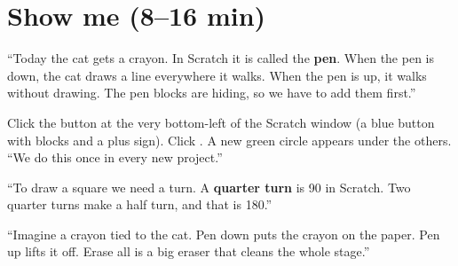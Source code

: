 \section{Show me (8--16 min)}
\begin{teacherscript}
\enquote{Today the cat gets a crayon. In Scratch it is called the \textbf{pen}. When the pen is down, the cat draws a line everywhere it walks. When the pen is up, it walks without drawing. The pen blocks are hiding, so we have to add them first.}

Click the  button at the very bottom-left of the Scratch window (a blue button with blocks and a plus sign). Click . A new green  circle appears under the others. \enquote{We do this once in every new project.}

\enquote{To draw a square we need a turn. A \textbf{quarter turn} is 90 in Scratch. Two quarter turns make a half turn, and that is 180.}
\end{teacherscript}

\begin{analogy}
\enquote{Imagine a crayon tied to the cat. Pen down puts the crayon on the paper. Pen up lifts it off. Erase all is a big eraser that cleans the whole stage.}
\end{analogy}

